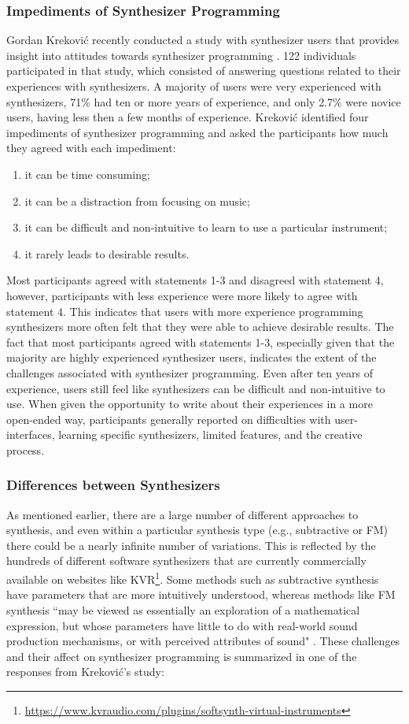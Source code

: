 \subsubsection{Impediments of Synthesizer Programming}
Gordan Krekovi\'{c} recently conducted a study with synthesizer users that provides insight into attitudes towards synthesizer programming \cite{krekovic2019insights}. 122 individuals participated in that study, which consisted of answering questions related to their experiences with synthesizers. A majority of users were very experienced with synthesizers, 71\% had ten or more years of experience, and only 2.7\% were novice users, having less then a few months of experience. Krekovi\'{c} identified four impediments of synthesizer programming and asked the participants how much they agreed with each impediment:
\begin{enumerate}
    \item it can be time consuming;
    \item it can be a distraction from focusing on music;
    \item it can be difficult and non-intuitive to learn to use a particular instrument;
    \item it rarely leads to desirable results.
\end{enumerate}
Most participants agreed with statements 1-3 and disagreed with statement 4, however, participants with less experience were more likely to agree with statement 4. This indicates that users with more experience programming synthesizers more often felt that they were able to achieve desirable results. The fact that most participants agreed with statements 1-3, especially given that the majority are highly experienced synthesizer users, indicates the extent of the challenges associated with synthesizer programming. Even after ten years of experience, users still feel like synthesizers can be difficult and non-intuitive to use. When given the opportunity to write about their experiences in a more open-ended way, participants generally reported on difficulties with user-interfaces, learning specific synthesizers, limited features, and the creative process.

\subsubsection{Differences between Synthesizers}
As mentioned earlier, there are a large number of different approaches to synthesis, and even within a particular synthesis type (e.g., subtractive or FM) there could be a nearly infinite number of variations. This is reflected by the hundreds of different software synthesizers that are currently commercially available on websites like KVR\footnote{\url{https://www.kvraudio.com/plugins/softsynth-virtual-instruments}}. Some methods such as subtractive synthesis have parameters that are more intuitively understood, whereas methods like FM synthesis ``may be viewed as essentially an exploration of a mathematical expression, but whose parameters have little to do with real-world sound production mechanisms, or with perceived attributes of sound" \cite{seago2013new}. These challenges and their affect on synthesizer programming is summarized in one of the responses from Krekovi\'{c}'s study:

